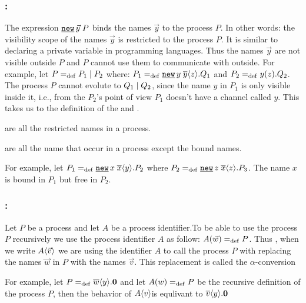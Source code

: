 \subsubsection{:}

The expression $\procres{\vec{y}}{P}$ binds the names $\vec{y}$ to the process $P$. In other words: the visibility scope of the  names $\vec{y}$ is restricted to the process $P$. It is similar to declaring a private variable in programming languages. Thus the names $\vec{y}$ are not visible outside $P$ and $P$ cannot use them to communicate with outside. For example, let $P=_{\mathrm{def}}P_1 \mid P_2$ where: $P_1\define\procres{y}{\out{y}{z}.Q_1}$ and $P_2=_{\mathrm{def}}y(z).Q_2$. The process $P$ cannot evolute to $Q_1 \mid Q_2$, since the name $y$ in $P_1$ is only visible inside it, i.e., from the $P_2$'s point of view $P_1$ doesn't have a channel called $y$. This takes us to the definition of the 
and 
.

\begin{definition}
\label{def_bound_names}
 are all the restricted names in a process.
\end{definition}
\begin{definition}
\label{def_free_names}
 are all the name that occur in a process except the bound names.
\end{definition}

For example, let $P_1\define\procres{x}{\out{x}{y}.P_2}$ where $P_2\define\procres{z}{\out{x}{z}.P_3}$. The name $x$ is bound in $P_1$ but free in $P_2$.


\subsubsection{:}
\label{subsubsection_process_call}

Let $P$ be a process and let $A$ be a process identifier.To be able to use the process $P$ recursively we use the process identifier $A$ as follow: $A(\vec{w})=_{\mathrm{def}}{}P$. Thus , when we write $A\langle\vec{v}\rangle$ we are using the identifier $A$ to call the process $P$ with replacing the names $\vec{w}$ in $P$ with the names $\vec{v}$. This replacement is called the $\alpha$-conversion

For example, let $P=_{\mathrm{def}}\overline{w}\langle y\rangle.\mathbf{0}$ and let $A(w)=_{\mathrm{def}}{}P$ be the recursive definition of the process $P$, then the behavior of $A\langle v\rangle$is equlivant to $\overline{v}\langle y\rangle.\mathbf{0}$ 

